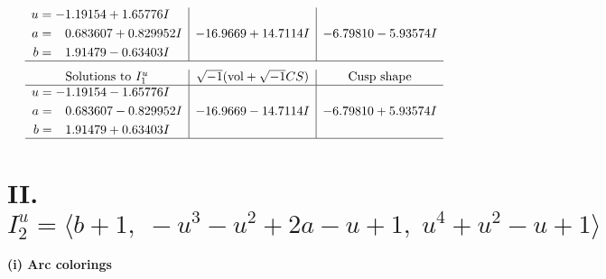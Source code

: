 \documentclass[1p]{elsarticle_modified}
\theoremstyle{definition}
\newcommand{\I}{\sqrt{-1}}
\begin{document}
$$\begin{array}{c|c|c}
\begin{aligned}
u &= -1.19154 + 1.65776 I \\
a &= \phantom{-}0.683607 + 0.829952 I \\
b &= \phantom{-}1.91479 - 0.63403 I\end{aligned}
 & -16.9669 + 14.7114 I & -6.79810 - 5.93574 I\\
 \hline 
 \end{array}$$\newpage$$\begin{array}{c|c|c}  
\text{Solutions to }I^u_{1}& \I (\text{vol} + \sqrt{-1}CS) & \text{Cusp shape}\\
 \hline 
\begin{aligned}
u &= -1.19154 - 1.65776 I \\
a &= \phantom{-}0.683607 - 0.829952 I \\
b &= \phantom{-}1.91479 + 0.63403 I\end{aligned}
 & -16.9669 - 14.7114 I & -6.79810 + 5.93574 I\\
 \hline 
 \end{array}$$\newpage\newpage\renewcommand{\arraystretch}{1}
\centering \section*{II. $I^u_{2}= \langle b+1,\;- u^3- u^2+2 a- u+1,\;u^4+u^2- u+1 \rangle$}
\flushleft \textbf{(i) Arc colorings}\\
\end{document}
